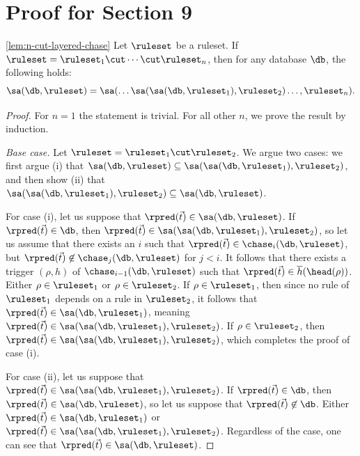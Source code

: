 \section{Proof for Section 9}

\begin{customlem}{\ref{lem:n-cut-layered-chase}}
Let $\ruleset$ be a ruleset. If $\ruleset = \ruleset_{1} \cut \cdots \cut \ruleset_{n}$, then for any database $\db$, the following holds:
$$
\sa(\db,\ruleset) = \sa(\ldots\sa(\sa(\db,\ruleset_{1}),\ruleset_{2}) \ldots, \ruleset_{n}).
$$
\end{customlem}

\begin{proof} For $n=1$ the statement is trivial. For all other $n$, we prove the result by induction.

\textit{Base case.} Let $\ruleset = \ruleset_{1} \cut \ruleset_{2}$. We argue two cases: we first argue (i) that $\sa(\db,\ruleset) \subseteq \sa(\sa(\db,\ruleset_{1}),\ruleset_{2})$, and then show (ii) that $\sa(\sa(\db,\ruleset_{1}),\ruleset_{2}) \subseteq \sa(\db,\ruleset)$. 

For case (i), let us suppose that $\rpred(\vec{t}) \in \sa(\db,\ruleset)$. If $\rpred(\vec{t}) \in \db$, then $\rpred(\vec{t}) \in \sa(\sa(\db,\ruleset_{1}),\ruleset_{2})$, so let us assume that there exists an $i$ such that $\rpred(\vec{t}) \in \chase_{i}(\db,\ruleset)$, but $\rpred(\vec{t}) \not\in \chase_{j}(\db,\ruleset)$ for $j < i$. It follows that there exists a trigger $(\rho,h)$ of $\chase_{i-1}(\db,\ruleset)$ such that $\rpred(\vec{t}) \in \overline{h}(\head(\rho))$. Either $\rho \in \ruleset_{1}$ or $\rho \in \ruleset_{2}$. If $\rho \in \ruleset_{1}$, then since no rule of $\ruleset_{1}$ depends on a rule in $\ruleset_{2}$, it follows that $\rpred(\vec{t}) \in \sa(\db,\ruleset_{1})$, meaning $\rpred(\vec{t}) \in \sa(\sa(\db,\ruleset_{1}),\ruleset_{2})$. If $\rho \in \ruleset_{2}$, then $\rpred(\vec{t}) \in \sa(\sa(\db,\ruleset_{1}),\ruleset_{2})$, which completes the proof of case (i). 

For case (ii), let us suppose that $\rpred(\vec{t}) \in \sa(\sa(\db,\ruleset_{1}),\ruleset_{2})$. If $\rpred(\vec{t}) \in \db$, then $\rpred(\vec{t}) \in \sa(\db,\ruleset)$, so let us suppose that $\rpred(\vec{t}) \not\in \db$. Either $\rpred(\vec{t}) \in \sa(\db,\ruleset_{1})$ or $\rpred(\vec{t}) \in \sa(\sa(\db,\ruleset_{1}),\ruleset_{2})$. Regardless of the case, one can see that $\rpred(\vec{t}) \in \sa(\db,\ruleset)$.


\end{proof}
